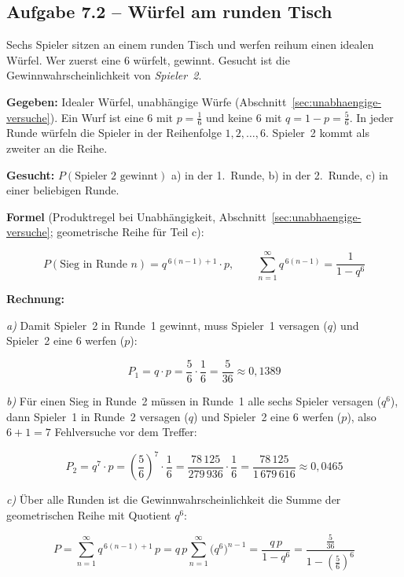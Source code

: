 \subsection*{Aufgabe 7.2 – Würfel am runden Tisch}

Sechs Spieler sitzen an einem runden Tisch und werfen reihum einen idealen Würfel.
Wer zuerst eine 6 würfelt, gewinnt. Gesucht ist die Gewinnwahrscheinlichkeit von
\emph{Spieler~2}.

\begin{beispiel}

\textbf{Gegeben:} Idealer Würfel, unabhängige Würfe
(Abschnitt~\ref{sec:unabhaengige-versuche}). Ein Wurf ist eine 6 mit
$p = \tfrac{1}{6}$ und keine 6 mit $q = 1-p = \tfrac{5}{6}$. In jeder Runde würfeln
die Spieler in der Reihenfolge $1,2,\ldots,6$. Spieler~2 kommt als zweiter an die Reihe.

\textbf{Gesucht:} $P(\text{Spieler 2 gewinnt})$ a) in der 1.\ Runde, b) in der 2.\ Runde,
c) in einer beliebigen Runde.

\textbf{Formel} (Produktregel bei Unabhängigkeit, Abschnitt~\ref{sec:unabhaengige-versuche};
geometrische Reihe für Teil c):

$$
P(\text{Sieg in Runde } n) = q^{\,6(n-1)+1}\cdot p,\qquad
\sum_{n=1}^{\infty} q^{\,6(n-1)} = \frac{1}{1-q^{6}}
$$

\textbf{Rechnung:}

\emph{a)} Damit Spieler~2 in Runde~1 gewinnt, muss Spieler~1 versagen ($q$) und
Spieler~2 eine 6 werfen ($p$):

$$
P_1 = q\cdot p = \frac{5}{6}\cdot\frac{1}{6} = \frac{5}{36} \approx 0{,}1389
$$

\emph{b)} Für einen Sieg in Runde~2 müssen in Runde~1 alle sechs Spieler versagen
($q^{6}$), dann Spieler~1 in Runde~2 versagen ($q$) und Spieler~2 eine 6 werfen ($p$),
also $6+1 = 7$ Fehlversuche vor dem Treffer:

$$
P_2 = q^{7}\cdot p = \left(\frac{5}{6}\right)^{7}\cdot\frac{1}{6}
= \frac{78\,125}{279\,936}\cdot\frac{1}{6}
= \frac{78\,125}{1\,679\,616} \approx 0{,}0465
$$

\emph{c)} Über alle Runden ist die Gewinnwahrscheinlichkeit die Summe der geometrischen
Reihe mit Quotient $q^{6}$:

$$
P = \sum_{n=1}^{\infty} q^{\,6(n-1)+1}\,p
= q\,p\sum_{n=1}^{\infty}\bigl(q^{6}\bigr)^{n-1}
= \frac{q\,p}{1-q^{6}}
= \frac{\tfrac{5}{36}}{1-\left(\tfrac{5}{6}\right)^{6}}
$$


\end{beispiel}
